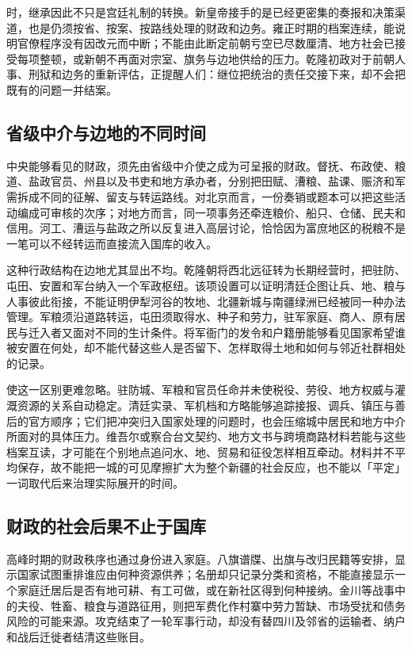 时，继承因此不只是宫廷礼制的转换。新皇帝接手的是已经更密集的奏报和决策渠道，也是仍须按省、按案、按路线处理的财政和边务。雍正时期的档案连续，能说明官僚程序没有因改元而中断；不能由此断定前朝亏空已尽数厘清、地方社会已接受每项整顿，或新朝不再面对宗室、旗务与边地供给的压力。乾隆初政对于前朝人事、刑狱和边务的重新评估，正提醒人们：继位把统治的责任交接下来，却不会把既有的问题一并结案。

\subsection{省级中介与边地的不同时间}

中央能够看见的财政，须先由省级中介使之成为可呈报的财政。督抚、布政使、粮道、盐政官员、州县以及书吏和地方承办者，分别把田赋、漕粮、盐课、赈济和军需拆成不同的征解、留支与转运路线。对北京而言，一份奏销或题本可以把这些活动编成可审核的次序；对地方而言，同一项事务还牵连粮价、船只、仓储、民夫和信用。河工、漕运与盐政之所以反复进入高层讨论，恰恰因为富庶地区的税粮不是一笔可以不经转运而直接流入国库的收入。

这种行政结构在边地尤其显出不均。乾隆朝将西北远征转为长期经营时，把驻防、屯田、安置和军台纳入一个军政枢纽。该项设置可以证明清廷企图让兵、地、粮与人事彼此衔接，不能证明伊犁河谷的牧地、北疆新城与南疆绿洲已经被同一种办法管理。军粮须沿道路转运，屯田须取得水、种子和劳力，驻军家庭、商人、原有居民与迁入者又面对不同的生计条件。将军衙门的发令和户籍册能够看见国家希望谁被安置在何处，却不能代替这些人是否留下、怎样取得土地和如何与邻近社群相处的记录。

使这一区别更难忽略。驻防城、军粮和官员任命并未使税役、劳役、地方权威与灌溉资源的关系自动稳定。清廷实录、军机档和方略能够追踪接报、调兵、镇压与善后的官方顺序；它们把冲突归入国家处理的问题时，也会压缩城中居民和地方中介所面对的具体压力。维吾尔或察合台文契约、地方文书与跨境商路材料若能与这些档案互读，才可能在个别地点追问水、地、贸易和征役怎样相互牵动。材料并不平均保存，故不能把一城的可见摩擦扩大为整个新疆的社会反应，也不能以「平定」一词取代后来治理实际展开的时间。

\subsection{财政的社会后果不止于国库}

高峰时期的财政秩序也通过身份进入家庭。八旗谱牒、出旗与改归民籍等安排，显示国家试图重排谁应由何种资源供养；名册却只记录分类和资格，不能直接显示一个家庭迁居后是否有地可耕、有工可做，或在新社区得到何种接纳。金川等战事中的夫役、牲畜、粮食与道路征用，则把军费化作村寨中劳力暂缺、市场受扰和债务风险的可能来源。攻克结束了一轮军事行动，却没有替四川及邻省的运输者、纳户和战后迁徙者结清这些账目。


